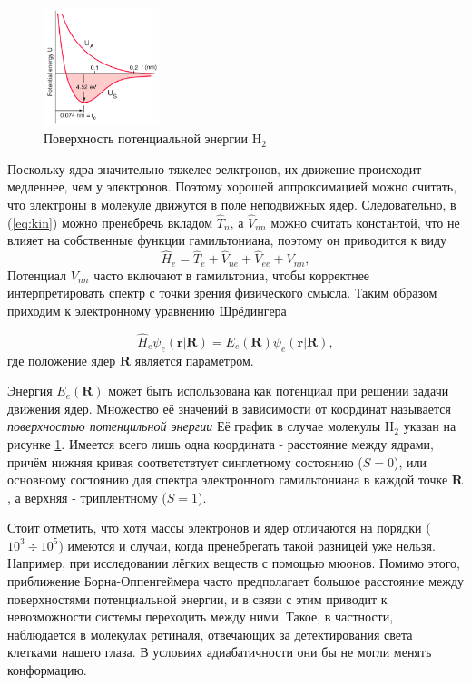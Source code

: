 \documentclass[12pt, oneside]{article}
\numberwithin{equation}{section}  %
\begin{document}
\begin{figure}
    \centering
    \includegraphics[width=0.3\textwidth]{./images/H2.png}
    \caption{Поверхность потенциальной энергии H\(_2\)}
    \label{fig:H2PPE}
\end{figure}
Поскольку ядра значительно тяжелее эелктронов, их движение происходит медленнее, чем у электронов. Поэтому хорошей аппроксимацией можно считать, что электроны в молекуле движутся в поле неподвижных ядер. 
Следовательно, в (\ref{eq:kin}) можно пренебречь вкладом \(\hat{T}_n\), а \(\hat{V}_{nn}\) можно считать константой, что не влияет на собственные функции гамильтониана, поэтому он приводится к виду
\begin{equation}
    \hat{H}_e = \hat{T}_e + \hat{V}_{ne} + \hat{V}_{ee} + V_{nn},
    \label{eq:H_e}
\end{equation}
Потенциал \(V_{nn}\) часто включают в гамильтониа, чтобы корректнее интерпретировать спектр с точки зрения физического смысла.
Таким образом приходим к электронному уравнению Шрёдингера

\begin{equation}
    \hat{H}_e \psi_e (\bm{r}| \bm{R} ) = E_e (\bm{R}) \psi_e (\bm{r}| \bm{R}),
    \label{eq:elH}
\end{equation}
где положение ядер \(\bm{R}\) является параметром.



Энергия \(E_e(\bm{R})\) может быть использована как потенциал при решении задачи движения ядер. Множество её значений в зависимости от координат называется \textit{поверхностью потенцильной энергии} Её график в случае молекулы H\(_2\) указан на рисунке \ref{fig:H2PPE}. Имеется всего лишь одна координата - расстояние между ядрами, причём нижняя кривая соответствтует синглетному состоянию (\(S = 0\)), или основному состоянию для спектра электронного гамильтониана в каждой точке \(\bm{R}\), а верхняя - триплентному (\(S = 1\)). 

Стоит отметить, что хотя массы электронов и ядер отличаются на порядки (\(10^3 \div 10^5\)) имеются и случаи, когда пренебрегать такой разницей уже нельзя. Например, при исследовании лёгких веществ с помощью мюонов. Помимо этого, приближение Борна-Оппенгеймера часто предполагает большое расстояние между поверхностями потенциальной энергии, и в связи с этим приводит к невозможности системы переходить между ними. Такое, в частности, наблюдается в молекулах ретиналя, отвечающих за детектирования света клетками нашего глаза. В условиях адиабатичности они бы не могли менять конформацию.
\end{document}
